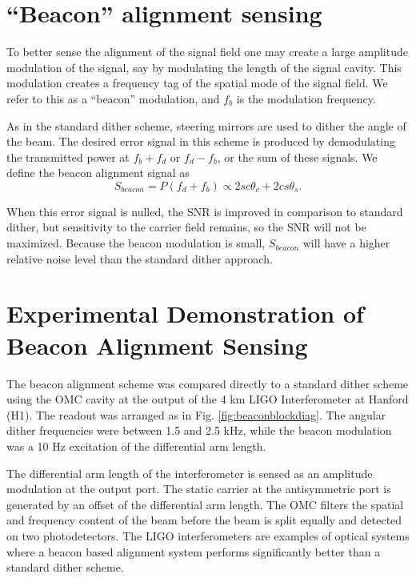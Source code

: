 \section{``Beacon'' alignment sensing}
\label{sec:beaconalignment}

To better sense the alignment of the signal field one may create a large amplitude modulation of the signal, say by modulating the length of the signal cavity. %
This modulation creates a frequency tag of the spatial mode of the signal field. %
We refer to this as a ``beacon'' %
modulation, and $f_b$ is the modulation frequency.

As in the standard dither scheme, steering mirrors are used to dither the angle of the beam. %
The desired error signal in this scheme is produced by demodulating the transmitted power at $f_b+f_d$ or $f_d-f_b$, or the sum of these signals. %
We define the beacon alignment signal as
%
\begin{equation}
\label{eq:sbeacon}
S_{beacon}=P(f_d+f_b) \propto 2sc\theta_c+2cs\theta_s.
\end{equation}
%

When this error signal is nulled, the SNR is improved in comparison to standard dither, but sensitivity to the carrier field remains, so the SNR will not be maximized. %
Because the beacon modulation is small, $S_{beacon}$ will have a higher relative noise level than the standard dither approach.

\section{Experimental Demonstration of Beacon Alignment Sensing}
%


The beacon alignment scheme was compared directly to a standard dither scheme using the OMC cavity at the output of the 4 km LIGO Interferometer at Hanford (H1). %
The readout was arranged as in Fig. %
\ref{fig:beaconblockdiag}. %
The angular dither frequencies were between 1.5 and 2.5 kHz, while the beacon modulation was a 10 Hz excitation of the differential arm length. %


The differential arm length of the interferometer is sensed as an amplitude modulation at the output port. %
The static carrier at the antisymmetric port is generated by an offset of the differential arm length. %
The OMC filters the spatial and frequency content of the beam before the beam is split equally and detected on two photodetectors. %
The LIGO interferometers are examples of optical systems where a beacon based alignment system performs significantly better than a standard dither scheme. %


